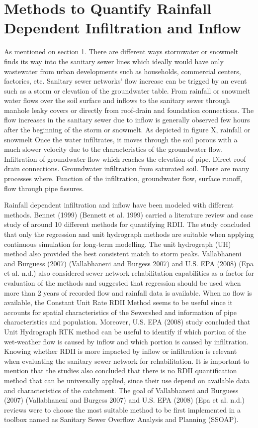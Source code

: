 \section{Methods to Quantify Rainfall Dependent Infiltration and Inflow}


As mentioned on section 1. There are different ways stormwater or snowmelt finds its way into the sanitary sewer lines which ideally would have only wastewater from urban developments such as households, commercial centers, factories, etc.  Sanitary sewer networks’ flow increase can be trigged by an event such as a storm or elevation of the groundwater table. From rainfall or snowmelt water flows over the soil surface and inflows to the sanitary sewer through manhole leaky covers or directly from roof-drain and foundation connections. The flow increases in the sanitary sewer due to inflow is generally observed few hours after the beginning of the storm or snowmelt. As depicted in figure X, rainfall or snowmelt   Once the water infiltrates, it moves through the soil porous with a much slower velocity due to the characteristics of the groundwater flow. Infiltration of groundwater flow which reaches the elevation of pipe. Direct roof drain connections. Groundwater infiltration from saturated soil.   
There are many processes where. Function of the infiltration, groundwater flow, surface runoff, flow through pipe fissures.

Rainfall dependent infiltration and inflow have been modeled with different methods. Bennet (1999) (Bennett et al. 1999) carried a literature review and case study of around 10 different methods for quantifying RDII. 
The study concluded that only the regression and unit hydrograph methods are suitable when applying continuous simulation for long-term modelling. The unit hydrograph (UH) method also provided the best consistent match to storm peaks. Vallabhaneni and Burguess (2007) (Vallabhaneni and Burgess 2007) and U.S. EPA (2008) (Epa et al. n.d.) also considered sewer network rehabilitation capabilities as a factor for evaluation of the methods and suggested that regression should be used when more than 2 years of recorded flow and rainfall data is available. When no flow is available, the Constant Unit Rate RDII Method seems to be useful since it accounts for spatial characteristics of the Sewershed and information of pipe characteristics and population. Moreover, U.S. EPA (2008) study concluded that Unit Hydrograph RTK method can be useful to identify if which portion of the wet-weather flow is caused by inflow and which portion is caused by infiltration. Knowing whether RDII is more impacted by inflow or infiltration is relevant when evaluating the sanitary sewer network for rehabilitation. 
It is important to mention that the studies also concluded that there is no RDII quantification method that can be universally applied, since their use depend on available data and characteristics of the catchment. The goal of Vallabhaneni and Burguess (2007) (Vallabhaneni and Burgess 2007) and U.S. EPA (2008) (Epa et al. n.d.) reviews were to choose the most suitable method to be first implemented in a toolbox named as Sanitary Sewer Overflow Analysis and Planning (SSOAP). 

